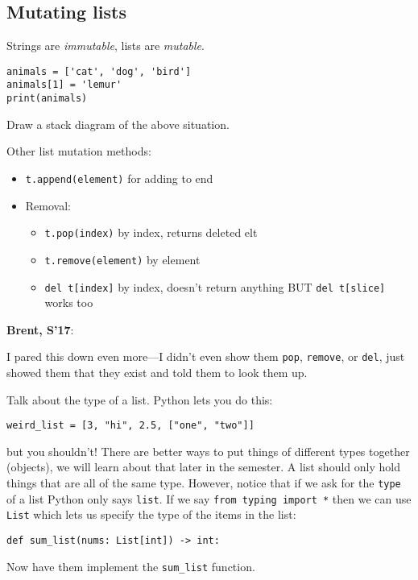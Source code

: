 \documentclass{article}
\newenvironment{reflect}[1]
{
  \noindent
  \begin{lrbox}{\reflectbox}
    \begin{minipage}[t]{\textwidth}
      \textbf{#1}:
}{
    \end{minipage}
  \end{lrbox}
  \fbox{\usebox{\reflectbox}}
}
\begin{document}
\subsection*{Mutating lists}

Strings are \emph{immutable}, lists are \emph{mutable}.

\begin{verbatim}
animals = ['cat', 'dog', 'bird']
animals[1] = 'lemur'
print(animals)
\end{verbatim}
Draw a stack diagram of the above situation.

Other list mutation methods:
\begin{itemize}
\item \verb|t.append(element)| for adding to end
\item Removal:
  \begin{itemize}
  \item \verb|t.pop(index)| by index, returns deleted elt
  \item \verb|t.remove(element)| by element
  \item \verb|del t[index]| by index, doesn't return anything BUT
	\verb|del t[slice]| works too
  \end{itemize}
\end{itemize}

\begin{reflect}{Brent, S'17}
  I pared this down even more---I didn't even show them \verb|pop|,
  \verb|remove|, or \verb|del|, just showed them that they exist and
  told them to look them up.
\end{reflect}

Talk about the type of a list. Python lets you do this:
\begin{verbatim}
weird_list = [3, "hi", 2.5, ["one", "two"]]
\end{verbatim}
but you shouldn't!  There are better ways to put things of different
types together (objects), we will learn about that later in the
semester.  A list should only hold things that are all of the same
type. However, notice that if we ask for the \verb|type| of a list
Python only says \verb|list|.  If we say \verb|from typing import *|
then we can use \verb|List| which lets us specify the type of the
items in the list:

\begin{verbatim}
def sum_list(nums: List[int]) -> int:
\end{verbatim}

Now have them implement the \verb|sum_list| function.
\end{document}

